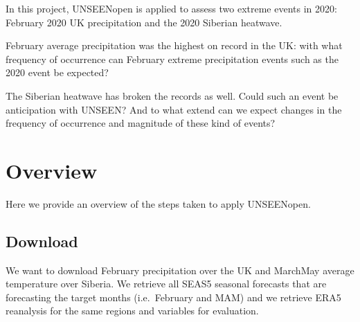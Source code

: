 \documentclass[letterpaper,10pt,english]{sphinxmanual}
\let\sphinxpxdimen\pdfpxdimen\else\newdimen\sphinxpxdimen
\begin{document}
\sphinxincludegraphics[width=1347\sphinxpxdimen,height=806\sphinxpxdimen]{{Workflow}.png}

In this project, UNSEEN\sphinxhyphen{}open is applied to assess two extreme events in 2020: February 2020 UK precipitation and the 2020 Siberian heatwave.

February average precipitation was the highest on record in the UK: with what frequency of occurrence can February extreme precipitation events such as the 2020 event be expected?

The Siberian heatwave has broken the records as well. Could such an event be anticipation with UNSEEN? And to what extend can we expect changes in the frequency of occurrence and magnitude of these kind of events?


\section{Overview}
\label{\detokenize{Notebooks/Workflow:Overview}}
Here we provide an overview of the steps taken to apply UNSEEN\sphinxhyphen{}open.


\subsection{Download}
\label{\detokenize{Notebooks/Workflow:Download}}
We want to download February precipitation over the UK and March\sphinxhyphen{}May average temperature over Siberia. We retrieve all SEAS5 seasonal forecasts that are forecasting the target months (i.e. February and MAM) and we retrieve ERA5 reanalysis for the same regions and variables for evaluation.

{
\begin{sphinxVerbatim}[commandchars=\\\{\}]
\llap{\color{nbsphinxin}[1]:\,\hspace{\fboxrule}\hspace{\fboxsep}} 
 
 
\end{sphinxVerbatim}
}
\end{document}
